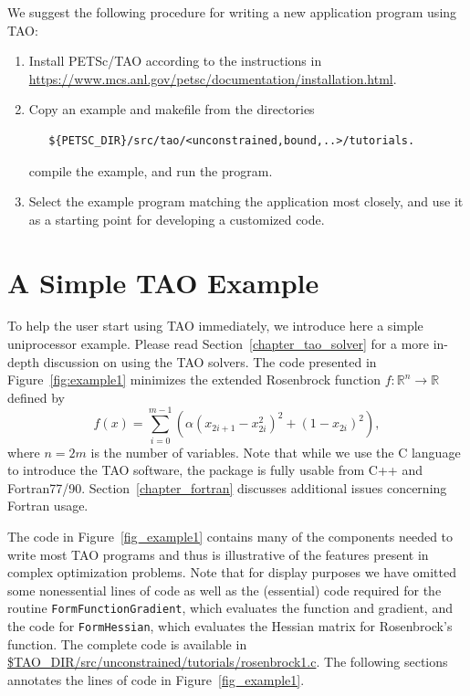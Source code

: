\documentclass[]{book}
\newcommand{\R}{\mathbb R}
\renewcommand{\Re}{\R}
\begin{document}
We suggest the following procedure for writing a new application
program using TAO:

\begin{enumerate}
\item Install PETSc/TAO according to the instructions in
  \url{https://www.mcs.anl.gov/petsc/documentation/installation.html}.
\item Copy an example and makefile from the directories
\begin{verbatim}
   ${PETSC_DIR}/src/tao/<unconstrained,bound,..>/tutorials.
\end{verbatim} 
  compile the example, and run the program. 
\item Select the example program matching the application most
  closely, and use it as a starting point for developing a customized
  code.
\end{enumerate}

\section{A Simple TAO Example}
\label{sec_simple}

To help the user start using TAO immediately, we introduce here a simple
uniprocessor example. Please read Section~\ref{chapter_tao_solver} for a 
more in-depth discussion on using the TAO solvers.
The code presented in Figure~\ref{fig:example1} minimizes the
extended Rosenbrock function $f: \Re^n \to \Re$ defined by
\[
 f(x) = 
 \sum_{i=0}^{m-1} \left( \alpha(x_{2i+1}-x_{2i}^2)^2 + (1-x_{2i})^2 \right),
\]
where $n = 2m$ is the number of variables.  Note that while we use the C 
language to introduce the TAO software, the package is fully usable from 
C++ and Fortran77/90.  Section~\ref{chapter_fortran} discusses additional 
issues concerning Fortran usage.



The code in Figure~\ref{fig_example1} contains many of the components
needed to write most TAO programs and thus is illustrative of the
features present in complex optimization problems.  Note that for
display purposes we have omitted some nonessential lines of code as well as the
(essential) code required for the routine \texttt{FormFunctionGradient},
which evaluates the function and gradient, and the code for
\texttt{FormHessian}, which evaluates the Hessian matrix for Rosenbrock's
function. The complete code is available in \url{$TAO\_DIR/src/unconstrained/tutorials/rosenbrock1.c}. %
The following sections annotates the lines of code in
Figure~\ref{fig_example1}.
\end{document}
